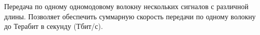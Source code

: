 Передача по одному одномодовому волокну нескольких сигналов с
различной длины. Позволяет обеспечить суммарную
скорость передачи по одному волокну до Терабит в секунду (Тбит/с).  